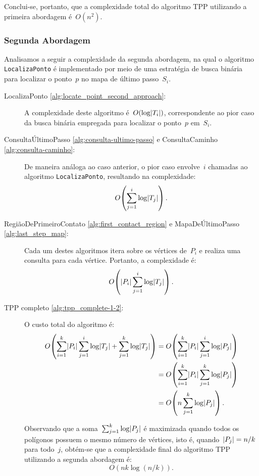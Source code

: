 \documentclass[11pt]{article}
\newcommand{\algref}[1]{\ref{#1}}
\DeclarePairedDelimiter{\abs}{\lvert}{\rvert}
\begin{document}
Conclui-se, portanto, que a complexidade total do algoritmo TPP utilizando a primeira abordagem é~\(O(n^2)\). 

\subsubsection{Segunda Abordagem}

Analisamos a seguir a complexidade da segunda abordagem, na qual o algoritmo \texttt{LocalizaPonto} é implementado por meio de uma estratégia de busca binária para localizar o ponto~\(p\) no mapa de último passo~\(S_i\).

\begin{description}

	\item[LocalizaPonto \algref{alg:locate_point_second_approach}:] A complexidade deste algoritmo é~\(O(\log \abs{T_i})\), correspondente ao pior caso da busca binária empregada para localizar o ponto~\(p\) em~\(S_i\).
	
	\item[ConsultaÚltimoPasso \algref{alg:consulta-ultimo-passo} e ConsultaCaminho \algref{alg:consulta-caminho}:] De maneira análoga ao caso anterior, o pior caso envolve~\(i\) chamadas ao algoritmo \texttt{LocalizaPonto}, resultando na complexidade:
	\[
		O\!\left(\sum_{j = 1}^{i} \log \abs{T_j}\right).
	\]

	\item[RegiãoDePrimeiroContato \algref{alg:first_contact_region} e MapaDeÚltimoPasso \algref{alg:last_step_map}:] Cada um destes algoritmos itera sobre os vértices de~\(P_i\) e realiza uma consulta para cada vértice. Portanto, a complexidade é:
	\[
		O\!\left(\abs{P_i} \sum_{j = 1}^{i} \log \abs{T_j}\right).
	\]

	\item[TPP completo \algref{alg:tpp_complete-1-2}:] O custo total do algoritmo é:
	\begin{align*}
		O\!\left(\sum_{i = 1}^{k} \abs{P_i} \sum_{j = 1}^{i} \log \abs{T_j} + \sum_{j = 1}^{k} \log \abs{T_j}\right)
		&= O\!\left(\sum_{i = 1}^{k} \abs{P_i} \sum_{j = 1}^{i} \log \abs{P_j}\right) \\
		&= O\!\left(\sum_{i = 1}^{k} \abs{P_i} \sum_{j = 1}^{k} \log \abs{P_j}\right) \\
		&= O\!\left(n \sum_{j = 1}^{k} \log \abs{P_j}\right).
	\end{align*}

	Observando que a soma~\(\sum_{j = 1}^{k} \log \abs{P_j}\) é maximizada quando todos os polígonos possuem o mesmo número de vértices, isto é, quando~\(\abs{P_j} = n/k\) para todo~\(j\), obtém-se que a complexidade final do algoritmo TPP utilizando a segunda abordagem é:
	\[
		O\!\left(nk \log (n/k)\right).
	\]

\end{description}
\end{document}
